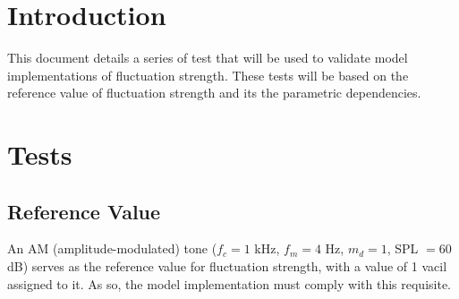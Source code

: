 \documentclass[a4paper]{article}
\begin{document}

\section{Introduction}

This document details a series of test that will be used to validate model
implementations of fluctuation strength. These tests will be based on the
reference value of fluctuation strength and its the parametric dependencies.

\section{Tests}

\subsection{Reference Value}

An AM (amplitude-modulated) tone ($f_c = 1$ kHz, $f_m = 4$ Hz, $m_d = 1$,
SPL $=60$ dB) serves as the reference value for fluctuation strength, with a
value of 1 vacil assigned to it. As so, the model implementation must comply
with this requisite.



\end{document}
